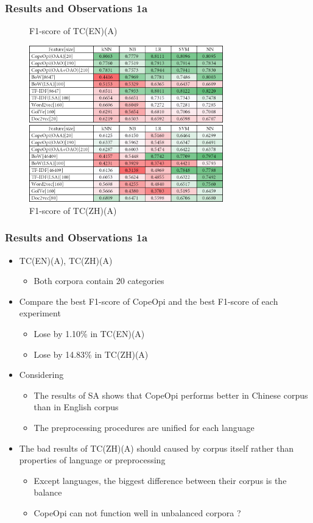 \documentclass[mathserif]{beamer}
\newcommand\expfigvspace{-2.5ex}
\begin{document}
\begin{frame}
\frametitle{Results and Observations 1a}
	\vspace{\expfigvspace}
	\begin{figure}
	\centering
	\caption{F1-score of TC(EN)(A)}
	\includegraphics[width=0.75\textwidth]{./figure/01B1.png}
	\caption{F1-score of TC(ZH)(A)}
	\includegraphics[width=0.75\textwidth]{./figure/02B1.png}
	\end{figure}
\end{frame}
\begin{frame}
\frametitle{Results and Observations 1a}
	\begin{itemize}
	\item TC(EN)(A), TC(ZH)(A)
		\begin{itemize}
		\item Both corpora contain 20 categories
		\end{itemize}
	\item Compare the best F1-score of CopeOpi and the best F1-score of each experiment
		\begin{itemize}
		\item Lose by 1.10\% in TC(EN)(A)
		\item Lose by 14.83\% in TC(ZH)(A)
		\end{itemize}
	\item Considering
		\begin{itemize}
		\item The results of SA shows that CopeOpi performs better in Chinese corpus than in English corpus
		\item The preprocessing procedures are unified for each language
		\end{itemize}
	\item The bad results of TC(ZH)(A) should caused by corpus itself rather than properties of language
or preprocessing	
		\begin{itemize}
		\item Except languages, the biggest difference between their corpus is the balance
		\item CopeOpi can not function well in unbalanced corpora ?
		\end{itemize}
	\end{itemize}
\end{frame}
\end{document}
